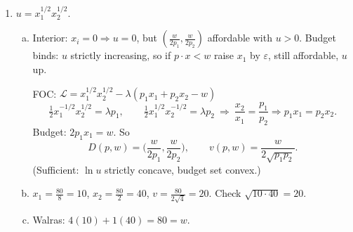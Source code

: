 \documentclass[12pt]{article}
\newcommand{\pref}{\succsim}
\newcommand{\R}{\mathbb{R}}
\begin{document}
\begin{enumerate}
\begin{enumerate}[(a)]
($\Rightarrow$) $x \pref y$, $z \in L(y) \Rightarrow y \pref z \Rightarrow x \pref z$ (trans.) $\Rightarrow z \in L(x)$. So $L(y) \subseteq L(x)$, $u(y) \le u(x)$.

($\Leftarrow$) Suppose $u(x) \ge u(y)$ but $\neg(x \pref y)$. Completeness $\Rightarrow y \pref x$, so $L(x) \subseteq L(y)$ by above. But $y \in L(y)$ ($y \pref y$) and $y \notin L(x)$. So $L(x) \subsetneq L(y) \Rightarrow u(x) < u(y)$. Contradiction.

\item $[0,1]^2$ is uncountable; complete + transitive alone may have too many strict levels to embed in $\R$. Need \emph{continuity} (contour sets closed) $\Rightarrow$ Debreu.

Example: lexicographic $x \pref y \iff x_1 > y_1$ or ($x_1 = y_1$, $x_2 \ge y_2$). Complete, transitive. Suppose $u$ represents it. $\forall t \in [0,1]$: $(t,1) \succ (t,0) \Rightarrow I_t = (u(t,0), u(t,1)) \ne \emptyset$. $t < t' \Rightarrow (t',0) \succ (t,1) \Rightarrow I_t \cap I_{t'} = \emptyset$. Uncountably many disjoint open intervals, each contains a rational $\Rightarrow$ injection $[0,1] \to \mathbb{Q}$. Contradiction.
\end{enumerate}

\item $u = x_1^{1/2} x_2^{1/2}$.
\begin{enumerate}[(a)]
\item Interior: $x_i = 0 \Rightarrow u = 0$, but $(\tfrac{w}{2p_1}, \tfrac{w}{2p_2})$ affordable with $u > 0$. Budget binds: $u$ strictly increasing, so if $p \cdot x < w$ raise $x_1$ by $\varepsilon$, still affordable, $u$ up.

FOC: $\mathcal{L} = x_1^{1/2}x_2^{1/2} - \lambda(p_1 x_1 + p_2 x_2 - w)$
\[
\tfrac12 x_1^{-1/2} x_2^{1/2} = \lambda p_1, \qquad \tfrac12 x_1^{1/2} x_2^{-1/2} = \lambda p_2
\ \Rightarrow\ \frac{x_2}{x_1} = \frac{p_1}{p_2} \Rightarrow p_1 x_1 = p_2 x_2 .
\]
Budget: $2 p_1 x_1 = w$. So
\[
D(p,w) = \Big( \frac{w}{2p_1}, \frac{w}{2p_2} \Big), \qquad
v(p,w) = \frac{w}{2\sqrt{p_1 p_2}} .
\]
(Sufficient: $\ln u$ strictly concave, budget set convex.)

\item $x_1 = \tfrac{80}{8} = 10$, $x_2 = \tfrac{80}{2} = 40$, $v = \tfrac{80}{2\sqrt{4}} = 20$. Check $\sqrt{10 \cdot 40} = 20$.

\item Walras: $4(10) + 1(40) = 80 = w$. \checkmark


\end{enumerate}
\end{enumerate}
\end{document}

